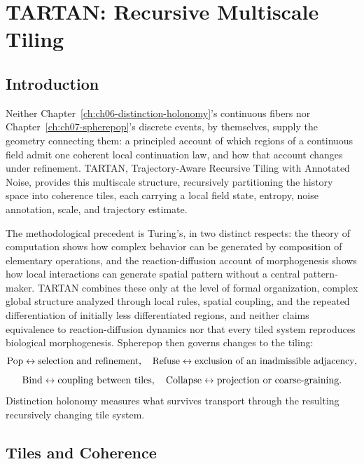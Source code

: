 
\chapter{TARTAN: Recursive Multiscale Tiling}
\label{ch:ch08-tartan-tiling}
\section{Introduction}

Neither Chapter~\ref{ch:ch06-distinction-holonomy}'s continuous fibers nor Chapter~\ref{ch:ch07-spherepop}'s discrete events, by themselves, supply the geometry connecting them: a principled account of which regions of a continuous field admit one coherent local continuation law, and how that account changes under refinement. TARTAN, Trajectory-Aware Recursive Tiling with Annotated Noise, provides this multiscale structure, recursively partitioning the history space into coherence tiles, each carrying a local field state, entropy, noise annotation, scale, and trajectory estimate.

The methodological precedent is Turing's, in two distinct respects: the theory of computation shows how complex behavior can be generated by composition of elementary operations, and the reaction-diffusion account of morphogenesis shows how local interactions can generate spatial pattern without a central pattern-maker. TARTAN combines these only at the level of formal organization, complex global structure analyzed through local rules, spatial coupling, and the repeated differentiation of initially less differentiated regions, and neither claims equivalence to reaction-diffusion dynamics nor that every tiled system reproduces biological morphogenesis. Spherepop then governs changes to the tiling:
\[
\mathrm{Pop} \leftrightarrow \text{selection and refinement}, \quad \mathrm{Refuse} \leftrightarrow \text{exclusion of an inadmissible adjacency},
\]
\[
\mathrm{Bind} \leftrightarrow \text{coupling between tiles}, \quad \mathrm{Collapse} \leftrightarrow \text{projection or coarse-graining}.
\]
Distinction holonomy measures what survives transport through the resulting recursively changing tile system.

\section{Tiles and Coherence}


